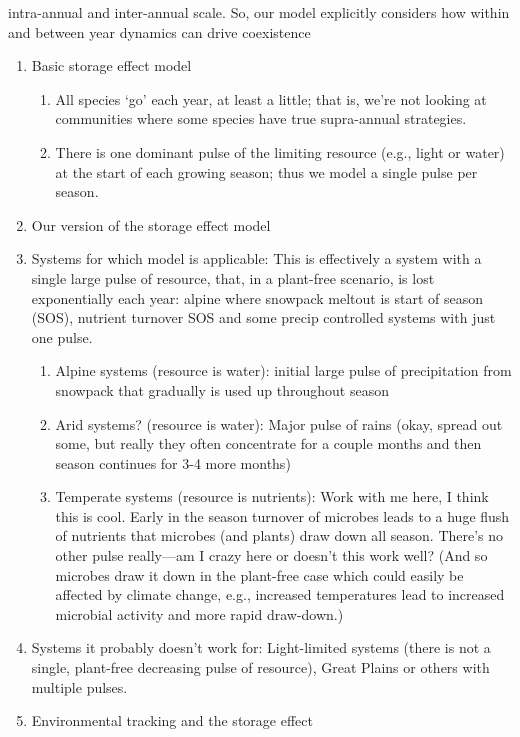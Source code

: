 \documentclass[11pt,letterpaper]{article}
\begin{document}
\begin{enumerate}
\begin{enumerate}
intra-annual and inter-annual scale. So, our model explicitly considers how within and between year dynamics can drive coexistence
\begin{enumerate}
\item Basic storage effect model
\begin{enumerate}
\item All species `go' each year, at least a little; that is, we're
  not looking at communities where some species have true
  supra-annual strategies.
\item There is one dominant pulse of the limiting resource (e.g.,
  light or water) at the
  start of each growing season; thus we model a  single pulse per
  season.
\end{enumerate}
\item Our version of the storage effect model
\item Systems for which model is applicable: This is effectively a system with a single large pulse of resource, that, in a plant-free scenario, is lost exponentially each year: alpine where snowpack meltout is start of season (SOS), nutrient turnover SOS and some precip controlled systems with just one pulse. 
\begin{enumerate}
\item Alpine systems (resource is water): initial large pulse of precipitation from
  snowpack that gradually is used up  throughout season
\item Arid systems? (resource is water): Major pulse of rains (okay, spread out some,
  but really they often concentrate for a couple months and then
  season continues for 3-4 more months)
\item Temperate systems (resource is nutrients): Work with me here, I
  think this is cool. Early in the season turnover of microbes leads
  to a huge flush of nutrients \citep{Zak:1990ar} that microbes (and plants) draw down
  all season. There's no other pulse really---am I crazy here or
  doesn't this work well? (And so microbes draw it down in the
  plant-free case which could easily be affected by climate change,
  e.g., increased temperatures lead to increased microbial activity
  and more rapid draw-down.)
\end{enumerate}
\item Systems it probably doesn't work for: Light-limited systems
  (there is not a single, plant-free decreasing pulse of resource),
  Great Plains or others with multiple pulses.
\item Environmental tracking and the storage effect

\end{enumerate}
\end{enumerate}
\end{enumerate}
\end{document}
